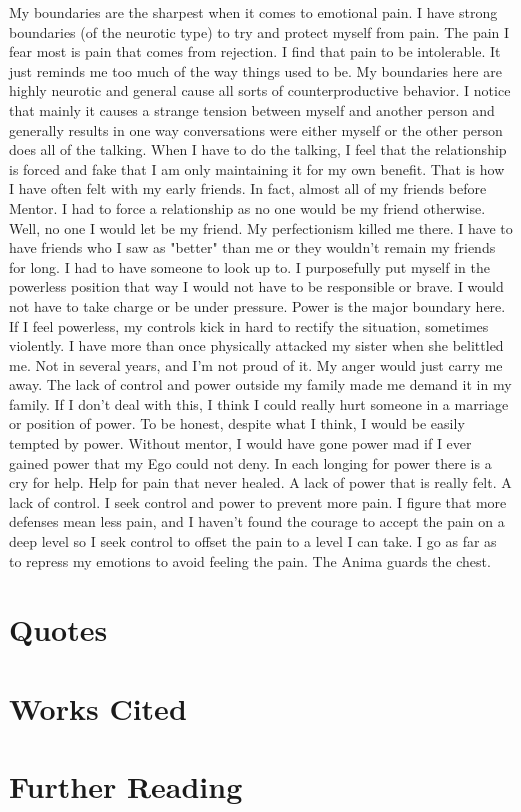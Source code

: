 My boundaries are the sharpest when it comes to emotional pain. I have strong boundaries (of the neurotic type) to try and protect myself from pain. The pain I fear most is pain that comes from rejection. I find that pain to be intolerable. It just reminds me too much of the way things used to be. My boundaries here are highly neurotic and general cause all sorts of counterproductive behavior. I notice that mainly it causes a strange tension between myself and another person and generally results in one way conversations were either myself or the other person does all of the talking. When I have to do the talking, I feel that the relationship is forced and fake that I am only maintaining it for my own benefit. That is how I have often felt with my early friends. In fact, almost all of my friends before Mentor. I had to force a relationship as no one would be my friend otherwise. Well, no one I would let be my friend. My perfectionism killed me there. I have to have friends who I saw as "better" than me or they wouldn't remain my friends for long. I had to have someone to look up to. I purposefully put myself in the powerless position that way I would not have to be responsible or brave. I would not have to take charge or be under pressure. Power is the major boundary here. If I feel powerless, my controls kick in hard to rectify the situation, sometimes violently. I have more than once physically attacked my sister when she belittled me. Not in several years, and I'm not proud of it. My anger would just carry me away. The lack of control and power outside my family made me demand it in my family. If I don't deal with this, I think I could really hurt someone in a marriage or position of power. To be honest, despite what I think, I would be easily tempted by power. Without mentor, I would have gone power mad if I ever gained power that my Ego could not deny. In each longing for power there is a cry for help. Help for pain that never healed. A lack of power that is really felt. A lack of control. I seek control and power to prevent more pain. I figure that more defenses mean less pain, and I haven't found the courage to accept the pain on a deep level so I seek control to offset the pain to a level I can take. I go as far as to repress my emotions to avoid feeling the pain. The Anima guards the chest. 

\section{Quotes}

\section{Works Cited}

\section{Further Reading}


